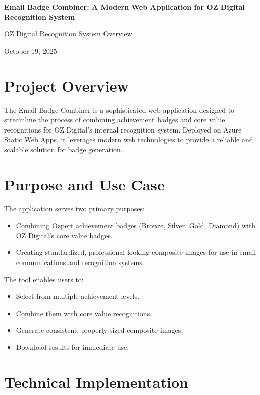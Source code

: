 \documentclass[12pt]{article}
\begin{document}
\begin{titlepage}
    \centering
    \vspace*{2cm}
    {\huge\bfseries Email Badge Combiner: A Modern Web Application for OZ Digital Recognition System\par}
    \vspace{1cm}
    {\large OZ Digital Recognition System Overview\par}
    \vspace{1.5cm}
    {\normalsize October 19, 2025\par}
    \vspace{1cm}
\end{titlepage}

\section{Project Overview}
The Email Badge Combiner is a sophisticated web application designed to streamline the process of combining achievement badges and core value recognitions for OZ Digital's internal recognition system. Deployed on Azure Static Web Apps, it leverages modern web technologies to provide a reliable and scalable solution for badge generation.

\section{Purpose and Use Case}
The application serves two primary purposes:
\begin{itemize}
    \item Combining Ozpert achievement badges (Bronze, Silver, Gold, Diamond) with OZ Digital's core value badges.
    \item Creating standardized, professional-looking composite images for use in email communications and recognition systems.
\end{itemize}
The tool enables users to:
\begin{itemize}
    \item Select from multiple achievement levels.
    \item Combine them with core value recognitions.
    \item Generate consistent, properly sized composite images.
    \item Download results for immediate use.
\end{itemize}

\section{Technical Implementation}
\end{document}
